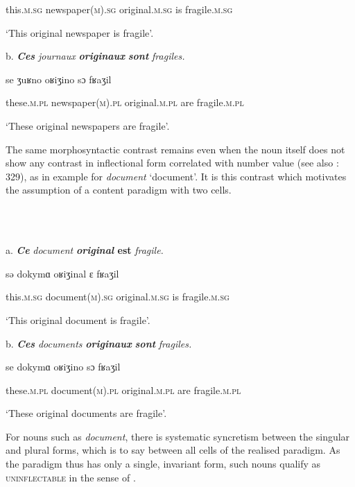 \documentclass[output=paper]{langscibook}
\begin{document}
    this.\textsc{m.sg} newspaper(\textsc{m})\textsc{.sg} original\textsc{.m.sg} is fragile\textsc{.m.sg}

    ‘This original newspaper is fragile’.

  b.   \textbf{\textit{Ces}} \textit{journaux} \textbf{\textit{originaux}} \textbf{\textit{sont}} \textit{fragiles.}  

    se  ʒuʁno    oʁiʒino  sɔ  fʁaʒil  

    these.\textsc{m.pl} newspaper(\textsc{m})\textsc{.pl} original\textsc{.m.pl} are fragile\textsc{.m.pl}

    ‘These original newspapers are fragile’.

The same morphosyntactic contrast remains even when the noun itself does not show any contrast in inflectional form correlated with number value (see also \citealt{Loporcaro2011}: 329), as in example  for \textit{document} ‘document’. It is this contrast which motivates the assumption of a content paradigm with two cells.

\ea%
    \label{ex:key:2}
    \gll \\
         \\
    \glt
    \z %

          a.   \textbf{\textit{Ce}} \textit{document} \textbf{\textit{original} \textbf{est} } \textit{fragile.}    

    sǝ dokymɑ  oʁiʒinal ɛ fʁaʒil  

    this.\textsc{m.sg} document(\textsc{m})\textsc{.sg}  original\textsc{.m.sg} is fragile\textsc{.m.sg}

    ‘This original document is fragile’.

  b.   \textbf{\textit{Ces}} \textit{documents} \textbf{\textit{originaux}} \textbf{\textit{sont}} \textit{fragiles.}  

    se  dokymɑ  oʁiʒino  sɔ  fʁaʒil  

    these.\textsc{m.pl} document(\textsc{m})\textsc{.pl} original\textsc{.m.pl} are fragile\textsc{.m.pl}

    ‘These original documents are fragile’.

For nouns such as \textit{document}, there is systematic syncretism between the singular and plural forms, which is to say between all cells of the realised paradigm. As the paradigm thus has only a single, invariant form, such nouns qualify as \textsc{uninflectable} in the sense of \citet{Spencer2020}.
\end{document}

